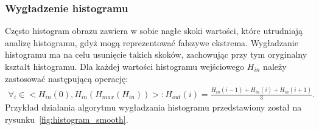 \subsubsection{Wygładzenie histogramu}
Często histogram obrazu zawiera w sobie nagłe skoki wartości, które utrudniają analizę histogramu, gdyż mogą reprezentować fałszywe ekstrema. Wygładzanie histogramu ma na celu usunięcie takich skoków, zachowując przy tym oryginalny kształt histogramu. Dla każdej wartości histogramu wejściowego \textit{$H_{in}$} należy zastosować następującą operację:
\begin{gather*}
  \forall_{i} \in \big< H_{in}(0), H_{in}(H_{max}(H_{in})) \big> :  H_{out}(i) = \frac{H_{in}(i-1) + H_{in}(i) + H_{in}(i+1)}{3}.
\end{gather*}
Przykład działania algorytmu wygładzania histogramu przedstawiony został na rysunku~\ref{fig:histogram_smooth}.
